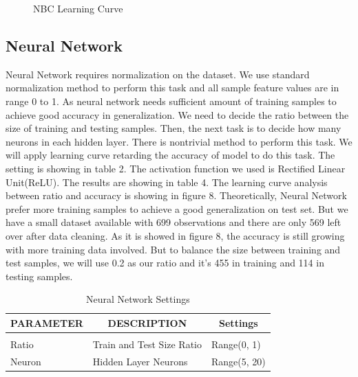 \documentclass{article} %
\begin{document}
\begin{figure}[H]
\begin{center}
\caption{NBC Learning Curve}
\end{center}
\end{figure}


\subsection{Neural Network}
Neural Network requires normalization on the dataset. We use standard normalization method to perform this task and all sample feature values are in range 0 to 1. As neural network needs sufficient amount of training samples to achieve good accuracy in generalization. We need to decide the ratio between the size of training and testing samples. Then, the next task is to decide how many neurons in each hidden layer. There is nontrivial method to perform this task. We will apply learning curve retarding the accuracy of model to do this task. The setting is showing in table 2. The activation function we used is Rectified Linear Unit(ReLU). The results are showing in table 4. The learning curve analysis between ratio and accuracy is showing in figure 8. Theoretically, Neural Network prefer more training samples to achieve a good generalization on test set. But we have a small dataset available with 699 observations and there are only 569 left over after data cleaning. As it is showed in figure 8, the accuracy is still growing with more training data involved. But to balance the size between training and test samples, we will use 0.2 as our ratio and it's 455 in training and 114 in testing samples. 

\begin{table}[H]
\caption{Neural Network Settings}
\begin{center}
\begin{tabular}{lll}
\multicolumn{1}{c}{\bf PARAMETER}  &\multicolumn{1}{c}{\bf DESCRIPTION}  &\multicolumn{1}{c}{\bf Settings}
\\ \hline \\
Ratio         &Train and Test Size Ratio & Range(0, 1) \\
Neuron   &Hidden Layer Neurons & Range(5, 20)\\
\end{tabular}
\end{center}
\end{table}
\end{document}
